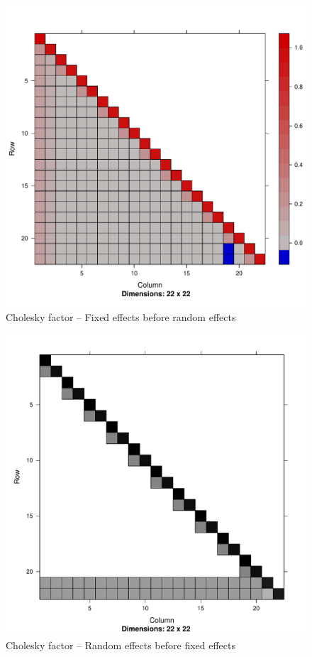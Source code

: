 	\begin{figure}[p]
		\includegraphics[width=0.95 \textwidth]{mX_mZ_cholesky.pdf}
		\caption{Cholesky factor -- Fixed effects before random effects}
		\label{fig:cholfixedrandom}
	\end{figure}
		
	\begin{figure}[p]
		\includegraphics[width=0.95 \textwidth]{mZ_mX_cholesky.pdf}
		\caption{Cholesky factor -- Random effects before fixed effects}
		\label{fig:cholrandomfixed}
	\end{figure}
		
